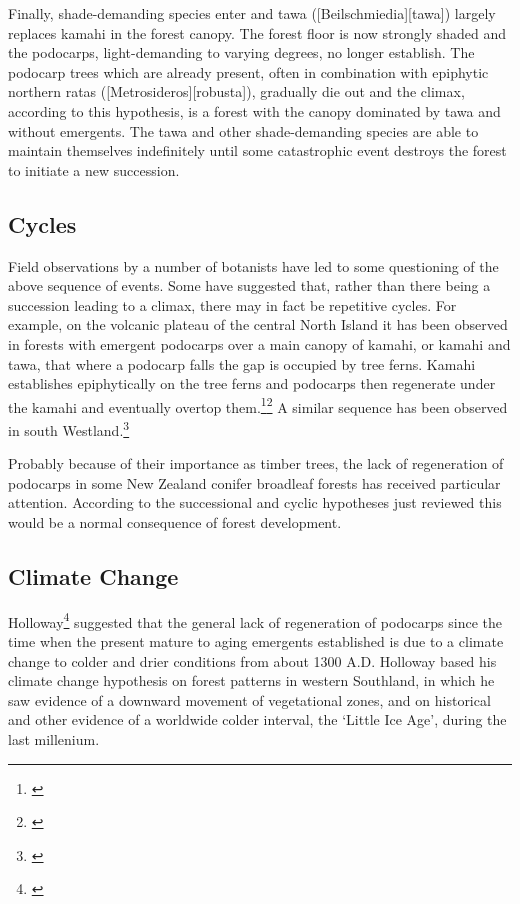 Finally, shade-demanding species enter and tawa ([Beilschmiedia][tawa]) largely replaces kamahi in the forest canopy.
The forest floor is now strongly shaded and the podocarps, light-demanding to varying degrees, no longer establish.
The podocarp trees which are already present, often in combination with epiphytic northern ratas ([Metrosideros][robusta]), gradually die out and the climax, according to this hypothesis, is a forest with the canopy dominated by tawa and without emergents.
The tawa and other shade-demanding species are able to maintain themselves indefinitely until some catastrophic event destroys the forest to initiate a new succession.

\subsection[Cycles]{Cycles }

Field observations by a number of botanists have led to some questioning of the above sequence of events.
Some have suggested that, rather than there being a succession leading to a climax, there may in fact be repetitive cycles.
For example, on the volcanic plateau of the central North Island it has been observed in forests with emergent podocarps over a main canopy of kamahi, or kamahi and tawa, that where a podocarp falls the gap is occupied by tree ferns.
Kamahi establishes epiphytically on the tree ferns and podocarps then regenerate under the kamahi and eventually overtop them.\footnote{\cite{cameron1955mosaic}}\footnote{\cite{beveridge1973regeneration}} A similar sequence has been observed in south Westland.\footnote{\cite{poole1937survey}}

Probably because of their importance as timber trees, the lack of regeneration of podocarps in some New Zealand conifer broadleaf forests has received particular attention.
According to the successional and cyclic hypotheses just reviewed this would be a normal consequence of forest development.

\subsection{Climate Change}

Holloway\footnote{\cite{holloway1954forests}} suggested that the general lack of regeneration of podocarps since the time when the present mature to aging emergents established is due to a climate change to colder and drier conditions from about 1300 A.D.
Holloway based his climate change hypothesis on forest patterns in western Southland, in which he saw evidence of a downward movement of vegetational zones, and on historical and other evidence of a worldwide colder interval, the `Little Ice Age', during the last millenium.

